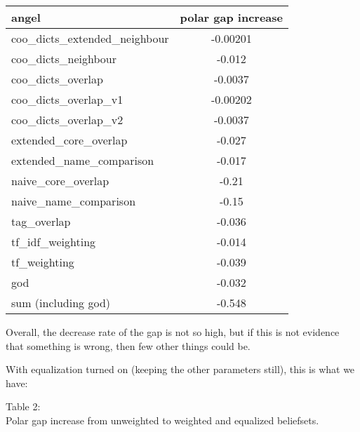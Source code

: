 \documentclass[11pt]{article}
\begin{document}
\begin{tabular}{l || c }
angel & polar gap increase \\
\hline
coo\_dicts\_extended\_neighbour & -0.00201 \\
 coo\_dicts\_neighbour &-0.012\\
 coo\_dicts\_overlap & -0.0037\\
 coo\_dicts\_overlap\_v1 & -0.00202\\
 coo\_dicts\_overlap\_v2& -0.0037\\
 extended\_core\_overlap& -0.027\\
 extended\_name\_comparison& -0.017\\
 naive\_core\_overlap& -0.21\\
 naive\_name\_comparison&  -0.15\\
 tag\_overlap&  -0.036\\
 tf\_idf\_weighting&  -0.014\\
 tf\_weighting&-0.039\\
 \hline
 god &-0.032 \\
\hline
sum (including god) & -0.548
\end{tabular}

\vspace{5pt}

Overall, the decrease rate of the gap is not so high, but if this is not evidence that something is wrong, then few other things could be.

%
%
%
%
%
%
%





With equalization turned on (keeping the other parameters still), this is what we have:

\vspace{5pt}
\begin{center}
Table 2:\\
Polar gap increase from unweighted to weighted and equalized beliefsets.\end{center}
\end{document}
